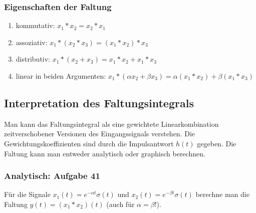 \documentclass[11pt]{article}
\begin{document}
\subsubsection*{Eigenschaften der Faltung}
\begin{enumerate}
    \item kommutativ: $x_1 \ast x_2 = x_2 \ast x_1$
    \item assoziativ: $x_1 \ast (x_2 \ast x_3) = (x_1 \ast x_2) \ast x_3$
    \item distributiv: $x_1 \ast (x_2 + x_3) = x_1 \ast x_2 + x_1 \ast x_3$
    \item linear in beiden Argumenten: $x_1 \ast (\alpha x_2 + \beta x_3) = \alpha (x_1 \ast x_2) + \beta (x_1 \ast x_3)$
\end{enumerate}

\subsection*{Interpretation des Faltungsintegrals}
\vspace*{-0.5cm}
Man kann das Faltungsintegral als eine gewichtete Linearkombination zeitverschobener Versionen des Eingangssignals verstehen. Die Gewichtungskoeffizienten sind durch die Impulsantwort $h(t)$ gegeben.
Die Faltung kann man entweder analytisch oder graphisch berechnen.

\vfill \null
\pagebreak

\subsubsection*{Analytisch: Aufgabe 41}
\vspace*{-0.5cm}
Für die Signale $x_1(t) = e^{-\alpha t}\sigma(t)$ und $x_2(t) = e^{-\beta t}\sigma(t)$ berechne man die Faltung $y(t) = (x_1 \ast x_2)(t)$ (auch für $\alpha = \beta$!).

\end{document}
